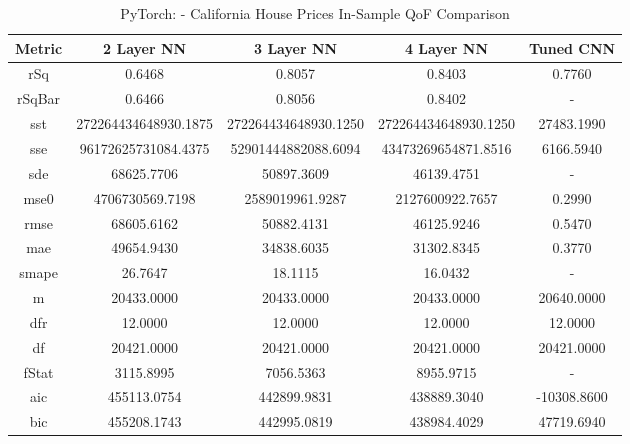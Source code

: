 \documentclass{article}
\begin{document}
\begin{table}[H]
\centering
\caption{PyTorch: - California House Prices In-Sample QoF Comparison}
\label{tab:PyTorch: - California House Prices In-Sample QoF Comparison}
\begin{tabular}{|c|c|c|c|c|} \hline
Metric & 2 Layer NN & 3 Layer NN & 4 Layer NN & Tuned CNN \\ \hline \hline
rSq & 0.6468 & 0.8057 & 0.8403 & 0.7760 \\ \hline
rSqBar & 0.6466 & 0.8056 & 0.8402 & - \\ \hline
sst & 272264434648930.1875 & 272264434648930.1250 & 272264434648930.1250 & 27483.1990 \\ \hline
sse & 96172625731084.4375 & 52901444882088.6094 & 43473269654871.8516 & 6166.5940 \\ \hline
sde & 68625.7706 & 50897.3609 & 46139.4751 & - \\ \hline
mse0 & 4706730569.7198 & 2589019961.9287 & 2127600922.7657 & 0.2990 \\ \hline
rmse & 68605.6162 & 50882.4131 & 46125.9246 & 0.5470 \\ \hline
mae & 49654.9430 & 34838.6035 & 31302.8345 & 0.3770 \\ \hline
smape & 26.7647 & 18.1115 & 16.0432 & - \\ \hline
m & 20433.0000 & 20433.0000 & 20433.0000 & 20640.0000 \\ \hline
dfr & 12.0000 & 12.0000 & 12.0000 & 12.0000 \\ \hline
df & 20421.0000 & 20421.0000 & 20421.0000 & 20421.0000 \\ \hline
fStat & 3115.8995 & 7056.5363 & 8955.9715 & - \\ \hline
aic & 455113.0754 & 442899.9831 & 438889.3040 & -10308.8600 \\ \hline
bic & 455208.1743 & 442995.0819 & 438984.4029 & 47719.6940 \\ \hline
\end{tabular}
\end{table}
\end{document}
